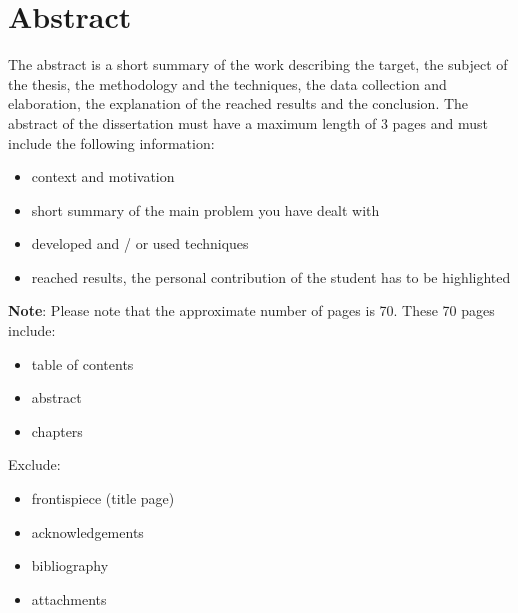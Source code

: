 \chapter*{Abstract} %
\label{abtract}

\vspace{0.4 cm}

The abstract is a short summary of the work describing the target, the subject of the thesis, the methodology 
and the techniques, the data collection and elaboration, the explanation of the reached results and the conclusion.
The abstract of the dissertation must have a maximum length of 3 pages and must include the following information: 

\begin{itemize}
  \item context and motivation
  \item short summary of the main problem you have dealt with
  \item developed and / or used techniques
  \item reached results, the personal contribution of the student has to be highlighted
\end{itemize}

\textbf{Note}:
Please note that the approximate number of pages is 70.
These 70 pages include:

\begin{itemize}
  \item table of contents
  \item abstract
  \item chapters
\end{itemize}

Exclude:

\begin{itemize}
  \item frontispiece (title page)
  \item acknowledgements
  \item bibliography
  \item attachments
\end{itemize}
